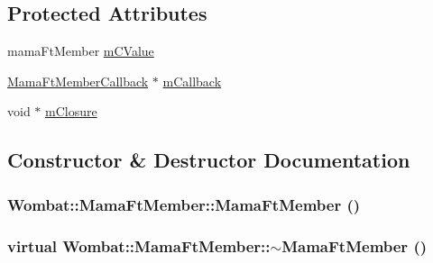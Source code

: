 \subsection*{Protected Attributes}
\begin{DoxyCompactItemize}
\item 
mamaFtMember \hyperlink{classWombat_1_1MamaFtMember_ab76b5c8785b2ed7d41e857db76a56686}{mCValue}
\item 
\hyperlink{classWombat_1_1MamaFtMemberCallback}{MamaFtMemberCallback} $\ast$ \hyperlink{classWombat_1_1MamaFtMember_a6d4a2f7d451434979bd7f7d69408bdae}{mCallback}
\item 
void $\ast$ \hyperlink{classWombat_1_1MamaFtMember_aabab786509f1b5c07ee3ea9da4355b5e}{mClosure}
\end{DoxyCompactItemize}


\subsection{Constructor \& Destructor Documentation}
\hypertarget{classWombat_1_1MamaFtMember_a78a5ee531a706e6c48c58a891588e0c7}{
\subsubsection[{MamaFtMember}]{\setlength{\rightskip}{0pt plus 5cm}Wombat::MamaFtMember::MamaFtMember ()}}
\label{classWombat_1_1MamaFtMember_a78a5ee531a706e6c48c58a891588e0c7}
\hypertarget{classWombat_1_1MamaFtMember_a553c0f20f0e0badba3cbfbc3b7560275}{
\subsubsection[{$\sim$MamaFtMember}]{\setlength{\rightskip}{0pt plus 5cm}virtual Wombat::MamaFtMember::$\sim$MamaFtMember ()}}
\label{classWombat_1_1MamaFtMember_a553c0f20f0e0badba3cbfbc3b7560275}


